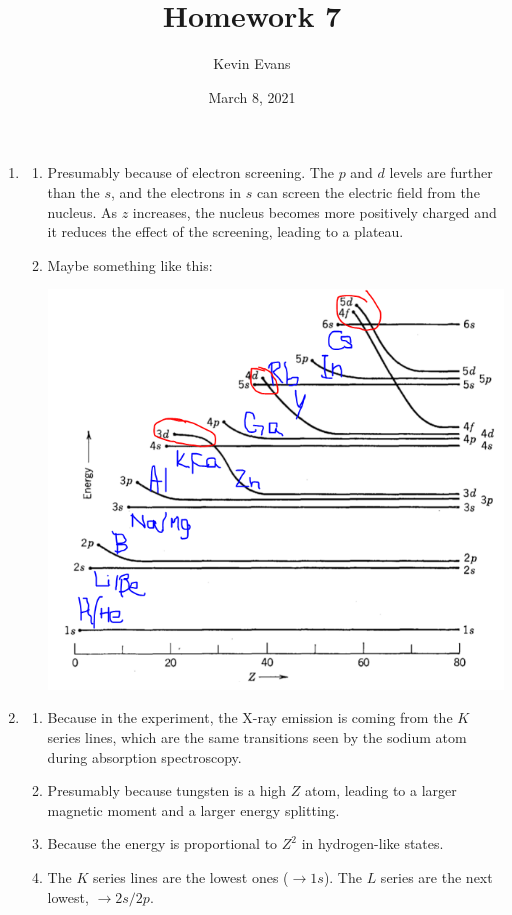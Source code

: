 \documentclass{homework}
\title{Homework 7}
\author{Kevin Evans}
\date{March 8, 2021}
\begin{document}
	\maketitle
	\begin{enumerate}
		\item \begin{enumerate}
			\item Presumably because of electron screening. The $p$ and $d$ levels are further than the $s$, and the electrons in $s$ can screen the electric field from the nucleus. As $z$ increases, the nucleus becomes more positively charged and it reduces the effect of the screening, leading to a plateau.
			
			\item Maybe something like this:
		
			\includegraphics[width=0.7\linewidth]{hw7_1}
			
		\end{enumerate}
		
		\item \begin{enumerate}
			\item Because in the experiment, the X-ray emission is coming from the $K$ series lines, which are the same transitions seen by the sodium atom during absorption spectroscopy.
			\item Presumably because tungsten is a high $Z$ atom, leading to a larger magnetic moment and a larger energy splitting.
			
			\item Because the energy is proportional to $Z^2$ in hydrogen-like states.
			
			\item The $K$ series lines are the lowest ones ($\to 1s$). The $L$ series are the next lowest, $\to 2s/2p$.
			

\end{enumerate}
\end{enumerate}
\end{document}
